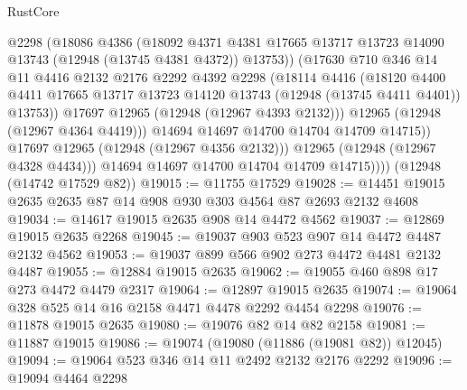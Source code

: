 \begin{lexlean}{RustCore}
\begin{coremodule}
                      @2298
                      (@18086
                        @4386
                        (@18092
                          @4371
                          @4381
                          @17665
                          @13717
                          @13723
                          @14090
                          @13743
                          (@12948 (@13745 @4381 @4372))
                          @13753))
                      (@17630
                        @710
                        @346
                        @14
                        @11
                        @4416
                        @2132
                        @2176
                        @2292
                        @4392
                        @2298
                        (@18114
                          @4416
                          (@18120
                            @4400
                            @4411
                            @17665
                            @13717
                            @13723
                            @14120
                            @13743
                            (@12948 (@13745 @4411 @4401))
                            @13753))
                        @17697
                        @12965
                        (@12948 (@12967 @4393 @2132)))
                      @12965
                      (@12948 (@12967 @4364 @4419)))
                    @14694
                    @14697
                    @14700
                    @14704
                    @14709
                    @14715))
                @17697
                @12965
                (@12948 (@12967 @4356 @2132)))
              @12965
              (@12948 (@12967 @4328 @4434)))
            @14694
            @14697
            @14700
            @14704
            @14709
            @14715))))
    (@12948 (@14742 @17529 @82))
@19015 := @11755 @17529
@19028 := @14451 @19015 @2635 @2635 @87 @14 @908 @930 @303 @4564 @87 @2693 @2132 @4608
@19034 := @14617 @19015 @2635 @908 @14 @4472 @4562
@19037 := @12869 @19015 @2635 @2268
@19045 := @19037 @903 @523 @907 @14 @4472 @4487 @2132 @4562
@19053 := @19037 @899 @566 @902 @273 @4472 @4481 @2132 @4487
@19055 := @12884 @19015 @2635
@19062 := @19055 @460 @898 @17 @273 @4472 @4479 @2317
@19064 := @12897 @19015 @2635
@19074 := @19064 @328 @525 @14 @16 @2158 @4471 @4478 @2292 @4454 @2298
@19076 := @11878 @19015 @2635
@19080 := @19076 @82 @14 @82 @2158
@19081 := @11887 @19015
@19086 := @19074 (@19080 (@11886 (@19081 @82)) @12045)
@19094 := @19064 @523 @346 @14 @11 @2492 @2132 @2176 @2292
@19096 := @19094 @4464 @2298

\end{coremodule}
\end{lexlean}
